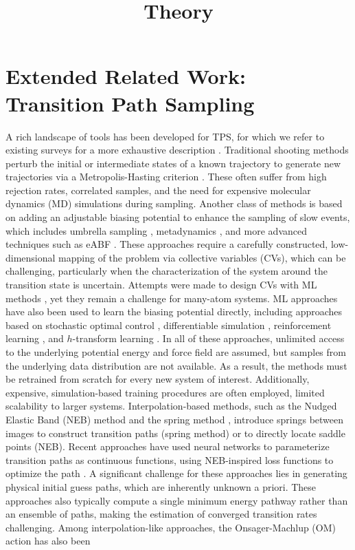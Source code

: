 \title{Theory}

\section{Extended Related Work: Transition Path Sampling}
\label{sec:extended_related_work}
A rich landscape of tools has been developed for TPS, for which we refer to existing surveys for a more exhaustive description \cite{bolhuis2002transition, dellago2002transition, vanden2010transition}. Traditional shooting methods perturb the initial or intermediate states of a known trajectory to generate new trajectories via a Metropolis-Hasting criterion \cite{mullen2015easy, borrero2016avoiding, jung2017transition, bolhuis2021transition}. These often suffer from high rejection rates, correlated samples, and the need for expensive molecular dynamics (MD) simulations during sampling. Another class of methods is based on adding an adjustable biasing potential to enhance the sampling of slow events, which includes umbrella sampling \cite{torrie1977nonphysical}, metadynamics \cite{Laio2002a}, and more advanced techniques such as eABF \cite{Darve2001a}. These approaches require a carefully constructed, low-dimensional mapping of the problem via collective variables (CVs), which can be challenging, particularly when the characterization of the system around the transition state is uncertain. Attempts were made to design CVs with ML methods \cite{Sultan2018AutomatedLearning,rogal2019neural, chen2018molecular,sun2022multitask,Sipka2023}, yet they remain a challenge for many-atom systems. ML approaches have also been used to learn the biasing potential directly, including approaches based on stochastic optimal control \cite{holdijk2024stochastic, yan2022learning}, differentiable simulation \cite{sipka2023differentiable}, reinforcement learning \cite{das2021reinforcement, rose2021reinforcement, singh2023variational, seong2024transitionpathsamplingimproved, liang2023probing}, and $h$-transform learning \cite{singh2023variational, du2024doob}. In all of these approaches, unlimited access to the underlying potential energy and force field are assumed, but samples from the underlying data distribution are not available. As a result, the methods must be retrained from scratch for every new system of interest. Additionally, expensive, simulation-based training procedures are often employed, limited scalability to larger systems. Interpolation-based methods, such as the Nudged Elastic Band (NEB) method \cite{nebmethod} and the spring method \cite{dellago}, introduce springs between images to construct transition paths (spring method) or to directly locate saddle points (NEB). Recent approaches have used neural networks to parameterize transition paths as continuous functions, using NEB-inspired loss functions to optimize the path \cite{ramakrishnan2025implicit, petersen2025pinn}. A significant challenge for these approaches lies in generating physical initial guess paths, which are inherently unknown a priori. These approaches also typically compute a single minimum energy pathway rather than an ensemble of paths, making the estimation of converged transition rates challenging. Among interpolation-like approaches, the Onsager-Machlup (OM) action has also been 
